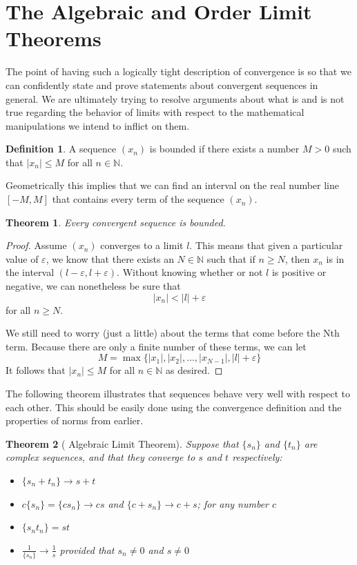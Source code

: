 \documentclass{tufte-book}
\newtheorem{theorem}{Theorem}[chapter]
\theoremstyle{definition}
\newtheorem{definition}{Definition}[chapter]
\numberwithin{section}{chapter}
\begin{document}
\section{The Algebraic and Order Limit Theorems}

The point of having such a logically tight description of convergence is so that we can confidently state and prove statements about convergent sequences in general.  We are ultimately trying to resolve arguments about what is and is not true regarding the behavior of limits with respect to the mathematical manipulations we intend to inflict on them.

\begin{definition} A sequence $(x_{n})$ is bounded if there exists a number $M>0$ such that $|x_{n}|\leq M$ for all $n \in \mathbb{N}$. \end{definition}

Geometrically this implies that we can find an interval on the real number line $[-M, M]$ that contains every term of the sequence $(x_{n})$.

\begin{theorem} Every convergent sequence is bounded. \end{theorem}

\begin{proof}
Assume $(x_{n})$ converges to a limit $l$. This means that given a particular value of $\varepsilon$, we know that there exists an $N \in \mathbb{N}$ such that if $n\geq N$, then $x_{n}$ is in the interval $(l-\varepsilon, l+\varepsilon)$.  Without knowing whether or not $l$ is positive or negative, we can nonetheless be sure that   $$ |x_{n}| < |l| + \varepsilon $$ for all $n\geq N$.

We still need to worry (just a little) about the terms that come before the Nth term.  Because there are only a finite number of these terms, we can let $$ M = \max \{|x_{1}|,|x_{2}|, \ldots, |x_{N-1}|,|l|+\varepsilon \}$$
It follows that $|x_{n}|\leq M$ for all $n \in \mathbb{N}$ as desired.
\end{proof}

The following theorem  illustrates that sequences behave very well with respect to each other.  This should be easily done using the convergence definition and the properties of norms from earlier.

\begin{theorem}[ Algebraic Limit Theorem] Suppose that $\{s_n\}$ and $\{t_n\}$ are complex sequences, and that they converge to $s$ and $t$ respectively:
\begin{itemize}
	\item $\{s_n + t_n\} \to s+t$
	\item $c\{s_n\} = \{cs_n\} \to cs$ and $\{c+s_n\} \to c+s$; for any number $c$
	\item $\{s_n t_n\} = st$
	\item $\frac{1}{\{s_n\}} \to \frac{1}{s}$  provided that $s_n \neq 0$ and $s \neq 0$
\end{itemize}
\end{theorem}
\end{document}
